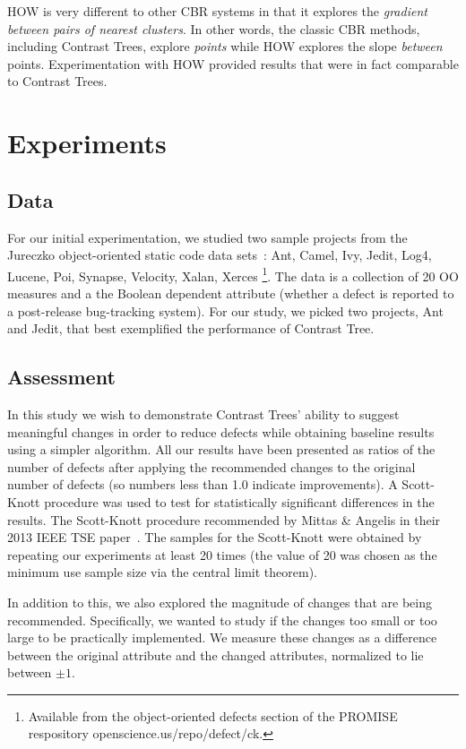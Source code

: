 \documentclass[conference]{IEEEtran}
\begin{document}
	HOW is very different to other CBR systems in that it explores the {\em gradient between pairs of nearest clusters}. In other words, the classic CBR methods, including Contrast Trees, explore {\em points} while
HOW explores the slope {\em between} points. Experimentation with HOW provided results that were in fact comparable to Contrast Trees. 
	
	\section{Experiments}
	\subsection{Data}
	For our initial experimentation, we studied two sample projects from the Jureczko object-oriented static code data sets~\cite{jureczko10}: Ant, Camel, Ivy, Jedit,   Log4, Lucene, Poi, Synapse, Velocity, Xalan, Xerces \footnote{Available from the object-oriented defects section of the PROMISE respository openscience.us/repo/defect/ck.}. The data is a collection of 20 OO measures and a the Boolean dependent attribute (whether a defect is reported to a post-release bug-tracking system). For our study, we picked two projects, Ant and Jedit, that best exemplified the performance of Contrast Tree. 
	\subsection{Assessment}
	In this study we wish to demonstrate Contrast Trees' ability to suggest meaningful changes in order to reduce defects while obtaining baseline results using a simpler algorithm. All our results have been presented as ratios of the number of defects after applying the recommended changes to the original number of defects (so numbers less than 1.0 indicate improvements). A Scott-Knott procedure was used to test for statistically significant differences in the results.
The Scott-Knott procedure recommended by Mittas \& Angelis in their 2013
IEEE TSE paper~\cite{mittas13}. The samples for the Scott-Knott were obtained by repeating our experiments at least 20 times (the value of 20 was chosen as the minimum use sample size via the central limit theorem).
	
	In addition to this, we also explored the magnitude of changes that are being recommended. Specifically, we wanted to study if the changes too small or too large to be practically implemented. We measure these changes as a difference between the original attribute and the changed attributes, normalized to lie between $\pm1$. 
\end{document}
